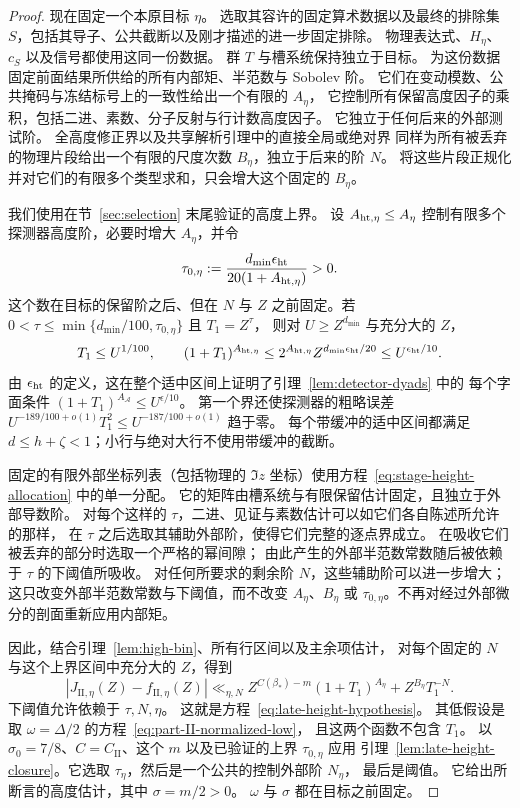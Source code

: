 \documentclass[11pt,a4paper]{article}
\numberwithin{equation}{section}
\numberwithin{figure}{section}
\theoremstyle{definition}
\theoremstyle{remark}
\begin{document}
\begin{proof}
现在固定一个本原目标 \(\eta\)。
选取其容许的固定算术数据以及最终的排除集 \(S\)，包括其导子、公共截断以及刚才描述的进一步固定排除。
物理表达式、\(H_\eta\)、\(c_S\) 以及信号都使用这同一份数据。
群 \(T\) 与槽系统保持独立于目标。
为这份数据固定前面结果所供给的所有内部矩、半范数与 Sobolev 阶。
它们在变动模数、公共掩码与冻结标号上的一致性给出一个有限的 \(A_\eta\)，
它控制所有保留高度因子的乘积，包括二进、素数、分子反射与行计数高度因子。
它独立于任何后来的外部测试阶。
全高度修正界以及共享解析引理中的直接全局或绝对界
同样为所有被丢弃的物理片段给出一个有限的尺度次数 \(B_\eta\)，独立于后来的阶 \(N\)。
将这些片段正规化并对它们的有限多个类型求和，只会增大这个固定的 \(B_\eta\)。

我们使用在节~\ref{sec:selection} 末尾验证的高度上界。
设 \(A_{{\rm ht},\eta}\le A_\eta\) 控制有限多个探测器高度阶，必要时增大 \(A_\eta\)，并令
\[
 \tau_{0,\eta}:=
       \frac{d_{\min}\epsilon_{\rm ht}}{20(1+A_{{\rm ht},\eta})}>0.
\]
这个数在目标的保留阶之后、但在 \(N\) 与 \(Z\) 之前固定。若
\(0<\tau\le\min\{d_{\min}/100,\tau_{0,\eta}\}\) 且 \(T_1=Z^\tau\)，
则对 \(U\ge Z^{d_{\min}}\) 与充分大的 \(Z\)，
\[
 T_1\le U^{1/100},\qquad
 (1+T_1)^{A_{{\rm ht},\eta}}
 \le2^{A_{{\rm ht},\eta}}Z^{d_{\min}\epsilon_{\rm ht}/20}
 \le U^{\epsilon_{\rm ht}/10}.
\]
由 \(\epsilon_{\rm ht}\) 的定义，这在整个适中区间上证明了引理~\ref{lem:detector-dyads} 中的
每个字面条件 \((1+T_1)^{A_{\mathcal A}}\le U^{\epsilon/10}\)。
第一个界还使探测器的粗略误差
\(U^{-189/100+o(1)}T_1^2\le U^{-187/100+o(1)}\) 趋于零。
每个带缓冲的适中区间都满足 \(d\le h+\zeta<1\)；小行与绝对大行不使用带缓冲的截断。

固定的有限外部坐标列表（包括物理的 \(\Im z\) 坐标）使用方程~\eqref{eq:stage-height-allocation} 中的单一分配。
它的矩阵由槽系统与有限保留估计固定，且独立于外部导数阶。
对每个这样的 \(\tau\)，二进、见证与素数估计可以如它们各自陈述所允许的那样，
在 \(\tau\) 之后选取其辅助外部阶，使得它们完整的逐点界成立。
在吸收它们被丢弃的部分时选取一个严格的幂间隙；
由此产生的外部半范数常数随后被依赖于 \(\tau\) 的下阈值所吸收。
对任何所要求的剩余阶 \(N\)，这些辅助阶可以进一步增大；
这只改变外部半范数常数与下阈值，而不改变 \(A_\eta\)、\(B_\eta\) 或
\(\tau_{0,\eta}\)。不再对经过外部微分的剖面重新应用内部矩。

因此，结合引理~\ref{lem:high-bin}、所有行区间以及主余项估计，
对每个固定的 \(N\) 与这个上界区间中充分大的 \(Z\)，得到
\[
 |J_{\mathrm{II},\eta}(Z)-f_{\mathrm{II},\eta}(Z)|
 \ll_{\eta,N}
 Z^{C(\beta_*)-m}(1+T_1)^{A_\eta}
       +Z^{B_\eta}T_1^{-N}.
\]
下阈值允许依赖于 \(\tau,N,\eta\)。
这就是方程~\eqref{eq:late-height-hypothesis}。
其低假设是取 \(\omega=\Delta/2\) 的方程~\eqref{eq:part-II-normalized-low}，
且这两个函数不包含 \(T_1\)。
以 \(\sigma_0=7/8\)、\(C=C_{\mathrm{II}}\)、这个 \(m\) 以及已验证的上界 \(\tau_{0,\eta}\) 应用
引理~\ref{lem:late-height-closure}。它选取 \(\tau_\eta\)，然后是一个公共的控制外部阶 \(N_\eta\)，
最后是阈值。
它给出所断言的高度估计，其中 \(\sigma=m/2>0\)。
\(\omega\) 与 \(\sigma\) 都在目标之前固定。
\end{proof}
\end{document}
